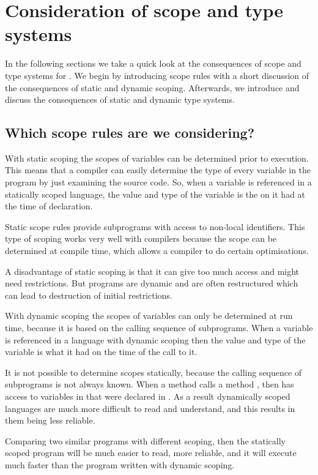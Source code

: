 \section{Consideration of scope and type systems}
\label{sec:anal-scoperules}
In the following sections we take a quick look at the consequences of scope and
type systems for \productname{}. We begin by introducing scope rules with a
short discussion of the consequences of static and dynamic scoping. Afterwards,
we introduce and discuss the consequences of static and dynamic type systems.

\subsection{Which scope rules are we considering?}

With static scoping the scopes of variables can be determined prior to
execution. This means that a compiler can easily determine the type of every
variable in the program by just examining the source code. So, when a variable
is referenced in a statically scoped language, the value and type of the variable 
is the on it had at the time of declaration.


Static scope rules provide subprograms with access to non-local
identifiers. This type of scoping works very well with compilers because
the scope can be determined at compile time, which allows a compiler to
do certain optimisations.

A disadvantage of static scoping is that it can give too much access and might
need restrictions. But programs are dynamic and are often restructured which
can lead to destruction of initial restrictions.

With dynamic scoping the scopes of variables can only be determined at
run time, because it is based on the calling sequence of subprograms.
When a variable is referenced in a language with dynamic scoping then
the value and type of the variable is what it had on the time of the
call to it. \cite[p. 227]{sebesta2013} %

It is not possible to determine scopes statically, because the calling
sequence of subprograms is not always known. When a method 
calls a method , then  has access to variables
in that were declared in . As a result dynamically scoped
languages are much more difficult to read and understand, and this
results in them being less reliable.

Comparing two similar programs with different scoping, then the statically
scoped program will be much easier to read, more reliable, and it will execute
much faster than the program written with dynamic scoping.
\cite[p. 229]{sebesta2013}


